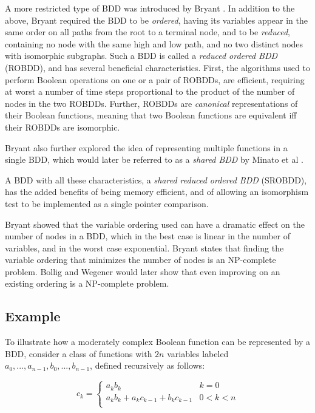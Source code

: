 \documentclass[a4paper,11pt]{kth-mag}
\begin{document}
A more restricted type of BDD was introduced by Bryant \cite{bryant86}.
In addition to the above, Bryant required the BDD to be \emph{ordered}, having its variables appear in the same order on all paths from the root to a terminal node,
and to be \emph{reduced}, containing no node with the same high and low path, and no two distinct nodes with isomorphic subgraphs.
Such a BDD is called a \emph{reduced ordered BDD} (ROBDD), and has several beneficial characteristics.
First, the algorithms used to perform Boolean operations on one or a pair of ROBDDs, are efficient, requiring at worst a number of time steps proportional to the product of the number of nodes in the two ROBDDs.
Further, ROBDDs are \emph{canonical} representations of their Boolean functions, meaning that two Boolean functions are equivalent iff their ROBDDs are isomorphic.

Bryant also further explored the idea of representing multiple functions in a single BDD, which would later be referred to as a \emph{shared BDD} by Minato et al \cite{minato90}.

A BDD with all these characteristics, a \emph{shared reduced ordered BDD} (SROBDD), has the added benefits of being memory efficient, and of allowing an isomorphism test to be implemented as a single pointer comparison.

Bryant showed that the variable ordering used can have a dramatic effect on the number of nodes in a BDD, which in the best case is linear in the number of variables, and in the worst case exponential.
Bryant states that finding the variable ordering that minimizes the number of nodes is an NP-complete problem.
Bollig and Wegener \cite{bollig96} would later show that even improving on an existing ordering is a NP-complete problem.


\subsection{Example}

To illustrate how a moderately complex Boolean function can be represented by a BDD, consider a class of functions with $2n$ variables labeled $a_0,...,a_{n-1},b_0,...,b_{n-1}$, defined recursively as follows:

$$
  c_k = \left\{
  \begin{array}{ll}
    a_k b_k                             & k = 0 \\
    a_k b_k + a_k c_{k-1} + b_k c_{k-1} & 0 < k < n \\
  \end{array}\right.
$$
\end{document}
